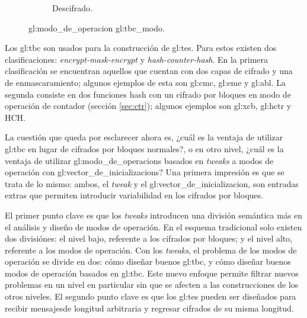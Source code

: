 \begin{figure}
\begin{subfigure}{0.45\textwidth}
\begin{center}
      \caption{Descifrado.}
    \end{center}
  \end{subfigure}
  \caption{\Gls{gl:modo_de_operacion} \gls{gl:tbc_modo}.}
  \label{figura:tbc}
\end{figure}

Los \gls{gl:tbc} son usados para la construcción de \gls{gl:tes}. Para estos
existen dos clasificaciones: \textit{encrypt-mask-encrypt} y
\textit{hash-counter-hash}. En la primera clasificación se encuentran aquellos
que cuentan con dos capas de cifrado y una de enmascaramiento; algunos ejemplos
de esta son \gls{gl:cmc}, \gls{gl:eme} y \gls{gl:abl}. La segunda consiste en
dos funciones hash con un cifrado por bloques en modo de operación de contador
(sección \ref{sec:ctr}); algunos ejemplos son \gls{gl:xcb}, \gls{gl:hctr}
y HCH.


La cuestión que queda por esclarecer ahora es, ¿cuál es la ventaja de utilizar
\gls{gl:tbc} en lugar de cifrados por bloques normales?, o en otro nivel,
¿cuál es la ventaja de utilizar \glspl{gl:modo_de_operacion} basados en
\textit{tweaks} a modos de operación con \glspl{gl:vector_de_inicializacion}?
Una primera impresión es que se trata de lo mismo: ambos, el \textit{tweak} y
el \gls{gl:vector_de_inicializacion}, son entradas extras que permiten
introducir variabilidad en los cifrados por bloques.

El primer punto clave es que los \textit{tweaks} introducen una división
semántica más en el análisis y diseño de modos de operación. En el esquema
tradicional solo existen dos divisiónes: el nivel bajo, referente a los
cifrados por bloques; y el nivel alto, referente a los modos de operación. Con
los \textit{tweaks}, el problema de los modos de operación se divide en dos:
cómo diseñar buenos \gls{gl:tbc}, y cómo diseñar buenos modos de operación
basados en \gls{gl:tbc}. Este nuevo enfoque permite filtrar nuevos problemas
en un nivel en particular sin que se afecten a las construcciones de los otros
niveles. El segundo punto clave es que los \gls{gl:tes} pueden ser diseñados
para recibir mensajesde longitud arbitraria y regresar cifrados de su misma
longitud.
